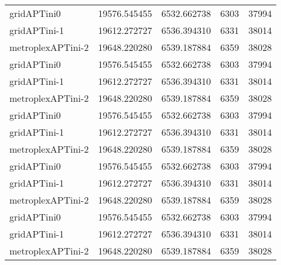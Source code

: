 \begin{table}[h]
\begin{longtable}{lrrrr}
gridAPTini0 & 19576.545455 & 6532.662738 & 6303 & 37994 \\
gridAPTini-1 & 19612.272727 & 6536.394310 & 6331 & 38014 \\
metroplexAPTini-2 & 19648.220280 & 6539.187884 & 6359 & 38028 \\
gridAPTini0 & 19576.545455 & 6532.662738 & 6303 & 37994 \\
gridAPTini-1 & 19612.272727 & 6536.394310 & 6331 & 38014 \\
metroplexAPTini-2 & 19648.220280 & 6539.187884 & 6359 & 38028 \\
gridAPTini0 & 19576.545455 & 6532.662738 & 6303 & 37994 \\
gridAPTini-1 & 19612.272727 & 6536.394310 & 6331 & 38014 \\
metroplexAPTini-2 & 19648.220280 & 6539.187884 & 6359 & 38028 \\
gridAPTini0 & 19576.545455 & 6532.662738 & 6303 & 37994 \\
gridAPTini-1 & 19612.272727 & 6536.394310 & 6331 & 38014 \\
metroplexAPTini-2 & 19648.220280 & 6539.187884 & 6359 & 38028 \\
gridAPTini0 & 19576.545455 & 6532.662738 & 6303 & 37994 \\
gridAPTini-1 & 19612.272727 & 6536.394310 & 6331 & 38014 \\
metroplexAPTini-2 & 19648.220280 & 6539.187884 & 6359 & 38028 \\
\end{longtable}
\end{table}

